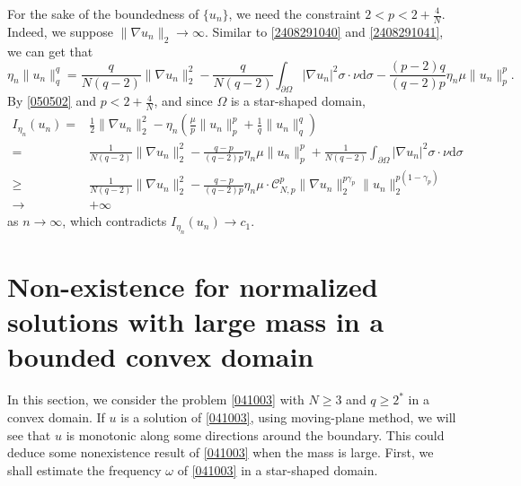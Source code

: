 \documentclass[10pt]{article}
\numberwithin{equation}{section}
\newcommand{\ud}{\mathrm{d}}
\numberwithin{equation}{section}
\begin{document}
For the sake of the boundedness of $\{u_n\}$, we need the constraint $2<p<2+\frac{4}{N}$. Indeed,  we suppose $\|\nabla u_n\|_2\to\infty$. Similar to \eqref{2408291040} and \eqref{2408291041}, we can get that
\begin{equation*}
\eta_n\|u_n\|^q_q=\frac{q}{N(q-2)}\|\nabla u_n\|^2_2
-\frac{q}{N(q-2)}\int_{\partial \Omega}|\nabla u_n|^2\sigma\cdot \nu \ud\sigma
-\frac{(p-2)q}{(q-2)p}\eta_n\mu\|u_n\|^p_p.
\end{equation*}
By \eqref{050502} and $p<2+\frac{4}{N}$, and since $\Omega$ is a star-shaped domain,
\begin{equation*}
\begin{aligned}
I_{\eta_n}(u_n)=&\frac{1}{2}\|\nabla u_n\|^2_2
-\eta_n\left(\frac{\mu}{p}\|u_n\|^{p}_p
+\frac{1}{q}\|u_n\|^{q}_q \right)\\
=&\frac{1}{N(q-2)}\|\nabla u_n\|^2_2
-\frac{q-p}{(q-2)p}\eta_n\mu \|u_n\|^{p}_p
+\frac{1}{N(q-2)}\int_{\partial \Omega}|\nabla u_n|^2\sigma\cdot \nu \ud\sigma\\
\geq&\frac{1}{N(q-2)}\|\nabla u_n\|^2_2
-\frac{q-p}{(q-2)p}\eta_n\mu  \cdot\mathcal{C}^p_{N,p}\|\nabla u_n\|^{p\gamma_{p}}_2
\|u_n\|^{p(1-\gamma_{p})}_2\\
\rightarrow&+\infty
\end{aligned}
\end{equation*}
as $n\to\infty$, which contradicts $I_{\eta_n}(u_n)\to c_1$.

\section{Non-existence for normalized solutions with large mass in a bounded convex domain}\label{S_4}
In this section, we consider the problem \eqref{041003} with $N\ge 3$ and $q\ge 2^*$ in a convex domain. If $u$ is a solution of \eqref{041003}, using moving-plane method, we will see that $u$ is monotonic along some directions around the boundary. This could deduce some nonexistence result of \eqref{041003} when the mass is large. First, we shall estimate the frequency $\omega$ of \eqref{041003} in a star-shaped domain.
\end{document}
